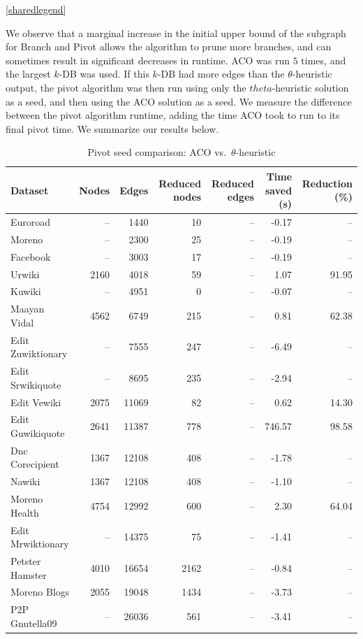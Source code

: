 \documentclass{article}
\begin{document}
\begin{center}
\ref{sharedlegend}
\end{center}

We observe that a marginal increase in the initial upper bound of the subgraph for Branch and Pivot allows the algorithm to prune more branches, and can sometimes result in significant decreases in runtime. ACO was run $5$ times, and the largest $k$-DB was used. If this $k$-DB had more edges than the $\theta$-heuristic output, the pivot algorithm was then run using only the $theta$-heuristic solution as a seed, and then using the ACO solution as a seed.
We measure the difference between the pivot algorithm runtime, adding the time ACO took to run to its final pivot time. We summarize our results below.

\begin{table}[htbp]
    \centering
    \caption{Pivot seed comparison: ACO vs.\ $\theta$-heuristic}
    \label{tab:seed-compare}
    \setlength{\tabcolsep}{4pt}
    \begin{tabular}{lrrrrrr}
      \toprule
      Dataset & Nodes & Edges & Reduced nodes & Reduced edges & Time saved (s) & Reduction (\%) \\
      \midrule
      Euroroad & -- & 1440 & 10 & -- & -0.17 & -- \\
      Moreno & -- & 2300 & 25 & -- & -0.19 & -- \\
      Facebook & -- & 3003 & 17 & -- & -0.19 & -- \\
      Urwiki & 2160 & 4018 & 59 & -- & 1.07 & 91.95 \\
      Kuwiki & -- & 4951 & 0 & -- & -0.07 & -- \\
      Maayan Vidal & 4562 & 6749 & 215 & -- & 0.81 & 62.38 \\
      Edit Zuwiktionary & -- & 7555 & 247 & -- & -6.49 & -- \\
      Edit Srwikiquote & -- & 8695 & 235 & -- & -2.94 & -- \\
      Edit Vewiki & 2075 & 11069 & 82 & -- & 0.62 & 14.30 \\
      Edit Guwikiquote & 2641 & 11387 & 778 & -- & 746.57 & 98.58 \\
      Dnc Corecipient & 1367 & 12108 & 408 & -- & -1.78 & -- \\
      Nawiki & 1367 & 12108 & 408 & -- & -1.10 & -- \\
      Moreno Health & 4754 & 12992 & 600 & -- & 2.30 & 64.04 \\
      Edit Mrwiktionary & -- & 14375 & 75 & -- & -1.41 & -- \\
      Petster Hamster & 4010 & 16654 & 2162 & -- & -0.84 & -- \\
      Moreno Blogs & 2055 & 19048 & 1434 & -- & -3.73 & -- \\
      P2P Gnutella09 & -- & 26036 & 561 & -- & -3.41 & -- \\
      \bottomrule
    \end{tabular}
\end{table}
    
\end{document}

